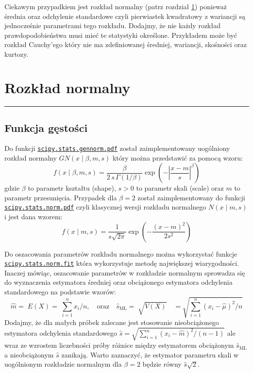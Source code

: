\documentclass[polish,]{book}
\begin{document}
Ciekawym przypadkiem jest rozkład normalny (patrz rozdział \ref{R2}) ponieważ średnia oraz odchylenie standardowe czyli pierwiastek kwadratowy z wariancji są jednocześnie parametrami tego rozkładu.
Dodajmy, że nie każdy rozkład prawdopodobieństwa musi mieć te statystyki określone.
Przykładem może być rozkład Cauchy'ego który nie ma zdefiniowanej średniej, wariancji, skośności oraz kurtozy.

\hypertarget{R2}{%
\chapter{Rozkład normalny}\label{R2}}

\begin{center}\rule{0.5\linewidth}{\linethickness}\end{center}

\hypertarget{R21}{%
\section{Funkcja gęstości}\label{R21}}

Do funkcji \href{https://docs.scipy.org/doc/scipy/reference/generated/scipy.stats.gennorm.html}{\texttt{scipy.stats.gennorm.pdf}} został zaimplementowany uogólniony rozkład normalny \(GN(x\;|\;\beta,m,s)\) który można przedstawić za pomocą wzoru:
\begin{equation}
f(x\;|\;\beta,m,s)=\frac{\beta}{2\,s\,\Gamma(1/\beta)}\exp\left(-\left|\frac{x-m}{s}\right|^\beta\right)
\label{eq:n01}
\end{equation}
gdzie \(\beta\) to parametr kształtu (shape), \(s>0\) to parametr skali (scale) oraz \(m\) to parametr przesunięcia. Przypadek dla \(\beta=2\) został zaimplementowany do funkcji \href{https://docs.scipy.org/doc/scipy/reference/generated/scipy.stats.norm.html\#scipy.stats.norm}{\texttt{scipy.stats.norm.pdf}} czyli klasycznej wersji rozkładu normalnego \(N(x\;|\;m,s)\) i jest dana wzorem:
\begin{equation}
f(x\;|\;m,s)=\frac{1}{s\sqrt{2\pi}}\exp{\left(-\frac{(x-m)^2}{2s^2}\right)}
\label{eq:n02}
\end{equation}

Do oszacowania parametrów rozkładu normalnego można wykorzystać funkcje \href{https://docs.scipy.org/doc/scipy/reference/generated/scipy.stats.norm.html\#scipy.stats.norm}{\texttt{scipy.stats.norm.fit}} która wykorzystuje metodę największej wiarygodności. Inaczej mówiąc, oszacowanie parametrów w rozkładzie normalnym sprowadza się do wyznaczenia estymatora średniej oraz obciążonego estymatora odchylenia standardowego na podstawie wzorów:
\[\hat{m}=\;E(X)=\;\sum_{i=1}^{n}x_i/n,
\quad\mbox{oraz}\quad \hat{s}_{\textrm{ML}}=\;\sqrt{V(X)}\quad=\sqrt{\sum_{i=1}^{n}(x_i-\hat{\mu})^2/n}
\]
Dodajmy, że dla małych próbek zalecane jest stosowanie nieobciążonego estymatora odchylenia standardowego \(\hat{s}=\sqrt{\sum_{i=1}^{n}(x_i-\hat{m})^2/(n-1)}\)
ale wraz ze wzrostem liczebności próby różnice między estymatorem obciążonym \(\hat{s}_\textrm{ML}\) a nieobciążonym \(\hat{s}\) zanikają. Warto zaznaczyć, że estymator parametru skali w uogólnionym rozkładzie normalnym dla \(\beta=2\) będzie równy \(\hat{s}\sqrt{2}\).
\end{document}
